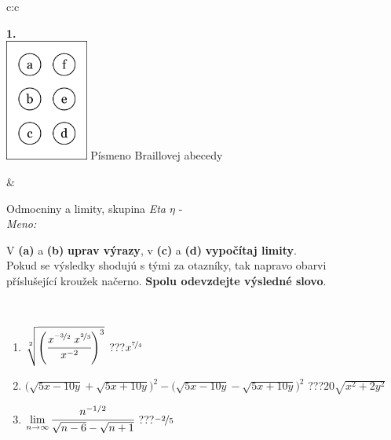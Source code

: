 \documentclass[10pt]{report}
\begin{document}
\begin{tabular}{c:c}
\begin{minipage}[c][104.5mm][t]{0.5\linewidth}
\begin{center}
\begin{minipage}{0.20\linewidth}
\begin{center}
{\Huge\bfseries 1.} \\[2mm]
\includegraphics[height=40mm]{../images/braille.png}
{\small Písmeno Braillovej abecedy}
\end{center}
\end{minipage}
\end{center}
\end{minipage}
&
\begin{minipage}[c][104.5mm][t]{0.5\linewidth}
\begin{center}
\vspace{7mm}
{\huge Odmocniny a limity, skupina \textit{Eta $\eta$} -}\\[5mm]
\textit{Meno:}\phantom{xxxxxxxxxxxxxxxxxxxxxxxxxxxxxxxxxxxxxxxxxxxxxxxxxxxxxxxxxxxxxxxxx}\\[5mm]
\begin{minipage}{0.95\linewidth}
\begin{center}
V \textbf{(a)} a \textbf{(b)} \textbf{uprav výrazy}, v \textbf{(c)} a \textbf{(d)} \textbf{vypočítaj limity}.\\Pokud se výsledky shodujú s tými za otazníky, tak napravo obarvi\\příslušející kroužek načerno. \textbf{Spolu odevzdejte výsledné slovo}.
\end{center}
\end{minipage}
\\[1mm]
\begin{minipage}{0.79\linewidth}
\begin{center}
\begin{varwidth}{\linewidth}
\begin{enumerate}
\small
\item $\sqrt[2]{\left(\cfrac{x^{\nicefrac{-3}{2}}\;x^{\nicefrac{2}{3}}}{x^{-2}}\right)^{3}}$\quad \dotfill\; ???\;\dotfill \quad $x^{\nicefrac{7}{4}}$
\item {\footnotesize{\scriptsize$\big(\sqrt{5x-10y}+\sqrt{5x+10y}\big)^2-\big(\sqrt{5x-10y}-\sqrt{5x+10y}\big)^2$}\quad \dotfill\; ???\;\dotfill \quad $20\sqrt{x^2+2y^2}$}
\item $\lim\limits_{n\to\infty}\cfrac{n^{-1/2}}{\sqrt{n-6}-\sqrt{n+1}}$\quad \dotfill\; ???\;\dotfill \quad $\nicefrac{-2}{5}$

\end{enumerate}
\end{varwidth}
\end{center}
\end{minipage}
\end{center}
\end{minipage}
\end{tabular}
\end{document}
